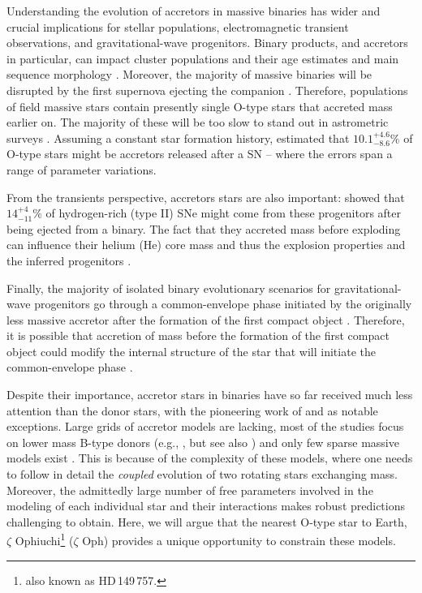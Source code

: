 \documentclass[twocolumn,twocolappendix,trackchanges]{aastex63}
\newcommand{\zoph}{$\zeta$ Oph}
\begin{document}
Understanding the evolution of accretors in massive binaries has wider
and crucial implications for stellar populations, electromagnetic
transient observations, and gravitational-wave progenitors. Binary
products, and accretors in particular, can impact cluster populations
and their age estimates and main sequence morphology
\citep[e.g.,][]{pols_marinus:94, wang:20}. Moreover, the majority of
massive binaries will be disrupted by the first supernova ejecting the
companion \citep[``binary SN scenario'', ][]{blaauw:61, dedonder:97,
  eldridge:11, renzo:19walk, evans:20}. Therefore, populations of
field massive stars contain presently single O-type stars that
accreted mass earlier on. The majority of these will be too slow to
stand out in astrometric surveys \citep[e.g.,][]{eldridge:11,
  renzo:19walk}. Assuming a constant star formation
history, \cite{renzo:19walk} estimated that $10.1^{+4.6}_{-8.6}\%$ of
O-type stars might be accretors released after a SN -- where the
errors span a range of parameter variations.

From the transients
perspective, accretors stars are also important: \cite{zapartas:19}
showed that $14_{-11}^{+4}\%$ of hydrogen-rich (type II) SNe might
come from these progenitors after being ejected from a binary. The
fact that they accreted mass before exploding can influence their
helium (He) core mass and thus the explosion properties and the
inferred progenitors \citep{zapartas:21}.

Finally, the majority of
isolated binary evolutionary scenarios for gravitational-wave
progenitors go through a common-envelope phase initiated by the
originally less massive accretor after the formation of the first
compact object \citep[e.g.,][]{belczynski:16nat, tauris:17,
  broekgaarden:21}. Therefore, it is possible that accretion of mass
before the formation of the first compact object could modify the
internal structure of the star that will initiate the common-envelope
phase \citep[e.g.][]{law-smith:20, klencki:21}.

Despite their importance, accretor stars in binaries have so far
received much less attention than the donor stars, with the pioneering
work of \cite{hellings:83, hellings:84} and \cite{braun:95} as notable
exceptions. Large grids of accretor models are lacking, most of the
studies focus on lower mass B-type donors
(e.g., \citealt{vanrensbergen:06, vanrensbergen:11}, but see also
\citealt{wang:20})  and only
few sparse massive models exist \citep[e.g.,][]{cantiello:07}. This is because of the complexity of these models, where one
needs to follow in detail the \emph{coupled} evolution of two rotating
stars exchanging mass. Moreover, the admittedly large number of free
parameters involved in the modeling of each individual star and their
interactions makes robust predictions challenging to obtain. Here, we
will argue that the nearest O-type star to Earth, $\zeta$
Ophiuchi\footnote{also known as HD\,149\,757.} (\zoph) provides a unique
opportunity to constrain these models.
\end{document}
